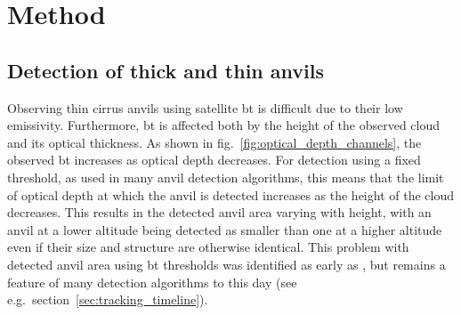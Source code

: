 \section{Method}

\subsection{Detection of thick and thin anvils}

Observing thin cirrus anvils using satellite \acrshort{bt} is difficult due to their low emissivity.
Furthermore, \acrshort{bt} is affected both by the height of the observed cloud and its optical thickness.
As shown in fig.~\ref{fig:optical_depth_channels}, the observed \acrshort{bt} increases as optical depth decreases.
For detection using a fixed threshold, as used in many anvil detection algorithms, this means that the limit of optical depth at which the anvil is detected increases as the height of the cloud decreases.
This results in the detected anvil area varying with height, with an anvil at a lower altitude being detected as smaller than one at a higher altitude even if their size and structure are otherwise identical.
This problem with detected anvil area using \acrshort{bt} thresholds was identified as early as \citet{augustine_mesoscale_1988}, but remains a feature of many detection algorithms to this day (see e.g.\ section~\ref{sec:tracking_timeline}).

